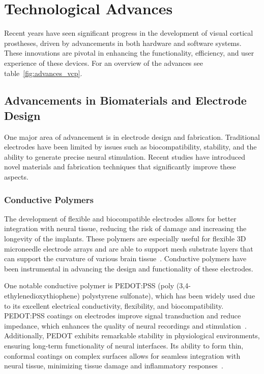 \documentclass[twocolumn,10pt]{article}
\begin{document}
\section*{Technological Advances}\label{sec:tech_advances}
Recent years have seen significant progress in the development of visual
cortical prostheses, driven by advancements in both hardware and software
systems. These innovations are pivotal in enhancing the functionality,
efficiency, and user experience of these devices. For an overview of the
advances see table~\ref{fig:advances_vcp}.

\subsection*{Advancements in Biomaterials and Electrode Design}
One major area of advancement is in electrode design and fabrication.
Traditional electrodes have been limited by issues such as biocompatibility,
stability, and the ability to generate precise neural stimulation. Recent
studies have introduced novel materials and fabrication techniques that
significantly improve these aspects.


\subsubsection*{Conductive Polymers}
The development of flexible and biocompatible electrodes allows for better
integration with neural tissue, reducing the risk of damage and increasing the
longevity of the implants. These polymers are especially useful for flexible 3D
microneedle electrode arrays and are able to support mesh substrate layers that
can support the curvature of various brain
tissue~\parencite{xiangFlexibleThreedimensionalElectrode2016}. Conductive
polymers have been instrumental in advancing the design and functionality of
these electrodes.

One notable conductive polymer is PEDOT:PSS (poly (3,4-ethylenedioxythiophene)
polystyrene sulfonate), which has been widely used due to its excellent
electrical conductivity, flexibility, and biocompatibility. PEDOT:PSS coatings
on electrodes improve signal transduction and reduce impedance, which enhances
the quality of neural recordings and
stimulation~\parencite{rivnayHighperformanceTransistorsBioelectronics2015}.
Additionally, PEDOT exhibits remarkable stability in physiological environments,
ensuring long-term functionality of neural interfaces. Its ability to form thin,
conformal coatings on complex surfaces allows for seamless integration with
neural tissue, minimizing tissue damage and inflammatory
responses~\parencite{zhangRecentProgressPEDOTbased2022}.
\end{document}
